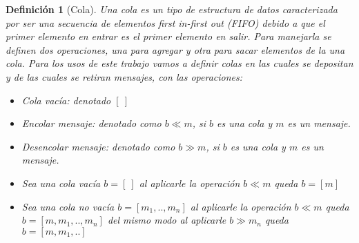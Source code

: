 \documentclass[paper=a4, fontsize=11pt, spanish]{scrartcl} %
\numberwithin{equation}{section} %
\numberwithin{figure}{section} %
\numberwithin{table}{section} %
\newtheorem{definition}{Definición}
\begin{document}
\begin{definition}[Cola]
\label{def:cola}
Una cola es un tipo de estructura de datos caracterizada por ser una secuencia de elementos first in-first out (FIFO) debido a que el primer elemento en entrar es el primer elemento en salir. Para manejarla se definen dos operaciones, una para agregar y otra para sacar elementos de la una cola. Para los usos de este trabajo vamos a definir colas en las cuales se depositan y de las cuales se retiran mensajes, con las operaciones:

\begin{itemize}
\item Cola vacía: denotado $[\ ]$
\item Encolar mensaje: denotado como $b \ll m$, si $b$ es una cola y $m$ es un mensaje.
\item Desencolar mensaje: denotado como $b \gg m$, si $b$ es una cola y $m$ es un mensaje.
\item Sea una cola vacía $b= [\ ]$ al aplicarle la operación $b \ll m$ queda $b= [m]$
\item Sea una cola no vacía $b= [m_1,..,m_n]$ al aplicarle la operación $b \ll m$ queda $b= [m,m_1,..,m_n]$ del mismo modo al aplicarle $b \gg m_n$ queda $b= [m,m_1,..]$
\end{itemize}
\end{definition}
\end{document}
